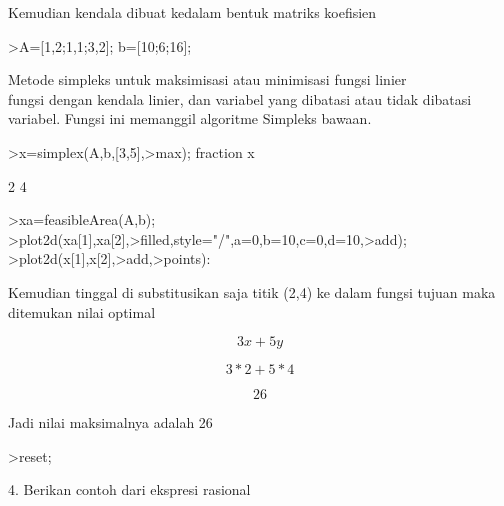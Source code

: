 \documentclass{article}
\begin{document}
\begin{eulernotebook}
\begin{eulercomment}
\begin{eulercomment}
\begin{eulercomment}
\begin{eulercomment}
\begin{eulercomment}
\begin{eulercomment}
\begin{eulercomment}
Kemudian kendala dibuat kedalam bentuk matriks koefisien
\end{eulercomment}
\begin{eulerprompt}
>A=[1,2;1,1;3,2]; b=[10;6;16];
\end{eulerprompt}
\begin{eulercomment}
Metode simpleks untuk maksimisasi atau minimisasi fungsi linier\\
fungsi dengan kendala linier, dan variabel yang dibatasi atau tidak
dibatasi variabel. Fungsi ini memanggil algoritme Simpleks bawaan.
\end{eulercomment}
\begin{eulerprompt}
>x=simplex(A,b,[3,5],>max); fraction x
\end{eulerprompt}
\begin{euleroutput}
          2 
          4 
\end{euleroutput}
\begin{eulerprompt}
>xa=feasibleArea(A,b);
>plot2d(xa[1],xa[2],>filled,style="/",a=0,b=10,c=0,d=10,>add);
>plot2d(x[1],x[2],>add,>points):
\end{eulerprompt}
\begin{eulercomment}
Kemudian tinggal di substitusikan saja titik (2,4) ke dalam fungsi
tujuan maka ditemukan nilai optimal

\end{eulercomment}
\begin{eulerformula}
\[
3x+5y
\]
\end{eulerformula}
\begin{eulerformula}
\[
3*2+5*4
\]
\end{eulerformula}
\begin{eulerformula}
\[
26
\]
\end{eulerformula}
\begin{eulercomment}
Jadi nilai maksimalnya adalah 26 
\end{eulercomment}
\begin{eulerprompt}
>reset;
\end{eulerprompt}
\begin{eulercomment}
4. Berikan contoh dari ekspresi rasional


\end{eulercomment}
\end{eulercomment}
\end{eulercomment}
\end{eulercomment}
\end{eulercomment}
\end{eulercomment}
\end{eulercomment}
\end{eulernotebook}
\end{document}
